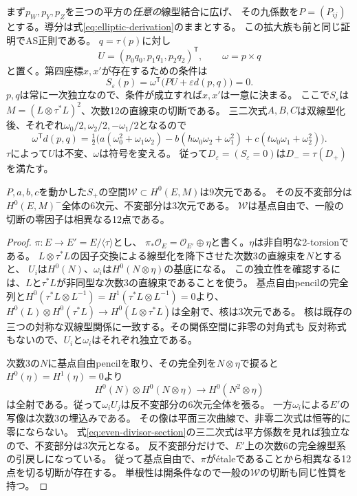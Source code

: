まず$p_W,p_Y,p_Z$を三つの平方の\emph{任意の}線型結合に広げ、
その九係数を$P=(P_{ij})$とする。導分は式\eqref{eq:elliptic-derivation}のままとする。
この拡大族も前と同じ証明でAS正則である。
$q=\tau(p)$に対し
\[
 U=(p_0q_0,p_1q_1,p_2q_2)^{\mathsf T},\qquad \omega=p\times q
\]
と置く。第四座標$x,x'$が存在するための条件は
\begin{equation}\label{eq:elliptic-divisor}
 S_\varepsilon(p)=\omega^{\mathsf T}\bigl(PU+\varepsilon d(p,q)\bigr)=0.
\end{equation}
$p,q$は常に一次独立なので、条件が成立すれば$x,x'$は一意に決まる。
ここで$S_\varepsilon$は$M=(L\otimes\tau^*L)^2$、次数12の直線束の切断である。
三二次式$A,B,C$は双線型化後、それぞれ$\omega_0/2,\omega_2/2,-\omega_1/2$となるので
\begin{equation}\label{eq:even-divisor-section}
 \omega^{\mathsf T}d(p,q)=\tfrac12\bigl(
 a(\omega_0^2+\omega_1\omega_2)
 -b(h\omega_0\omega_2+\omega_1^2)
 +c(t\omega_0\omega_1+\omega_2^2)\bigr).
\end{equation}
$\tau$によって$U$は不変、$\omega$は符号を変える。
従って$D_\varepsilon=(S_\varepsilon=0)$は$D_-=\tau(D_+)$を満たす。

\begin{lemma}[使える切断は反不変六次元と不変三次元]\label{lem:elliptic-sections}
$P,a,b,c$を動かした$S_+$の空間$\mathcal W\subset H^0(E,M)$は9次元である。
その反不変部分は$H^0(E,M)^-$全体の6次元、不変部分は3次元である。
$\mathcal W$は基点自由で、一般の切断の零因子は相異なる12点である。
\end{lemma}
\begin{proof}
$\pi:E\to E'=E/\langle\tau\rangle$とし、
$\pi_*\mathcal O_E=\mathcal O_{E'}\oplus\eta$と書く。$\eta$は非自明な2-torsionである。
$L\otimes\tau^*L$の因子交換による線型化を降下させた次数3の直線束を$N$とすると、
$U_i$は$H^0(N)$、$\omega_i$は$H^0(N\otimes\eta)$の基底になる。
この独立性を確認するには、$L$と$\tau^*L$が非同型な次数3の直線束であることを使う。
基点自由pencilの完全列と$H^0(\tau^*L\otimes L^{-1})=H^1(\tau^*L\otimes L^{-1})=0$より、
$H^0(L)\otimes H^0(\tau^*L)\to H^0(L\otimes\tau^*L)$は全射で、核は3次元である。
核は既存の三つの対称な双線型関係に一致する。その関係空間に非零の対角式も
反対称式もないので、$U_i$と$\omega_i$はそれぞれ独立である。

次数3の$N$に基点自由pencilを取り、その完全列を$N\otimes\eta$で捩ると
$H^0(\eta)=H^1(\eta)=0$より
\[
 H^0(N)\otimes H^0(N\otimes\eta)\longrightarrow H^0(N^2\otimes\eta)
\]
は全射である。従って$\omega_iU_j$は反不変部分の6次元全体を張る。
一方$\omega_i$による$E'$の写像は次数3の埋込みである。
その像は平面三次曲線で、非零二次式は恒等的に零にならない。
式\eqref{eq:even-divisor-section}の三二次式は平方係数を見れば独立なので、不変部分は3次元となる。
反不変部分だけで、$E'$上の次数6の完全線型系の引戻しになっている。
従って基点自由で、$\pi$が\'etaleであることから相異なる12点を切る切断が存在する。
単根性は開条件なので一般の$\mathcal W$の切断も同じ性質を持つ。
\end{proof}

